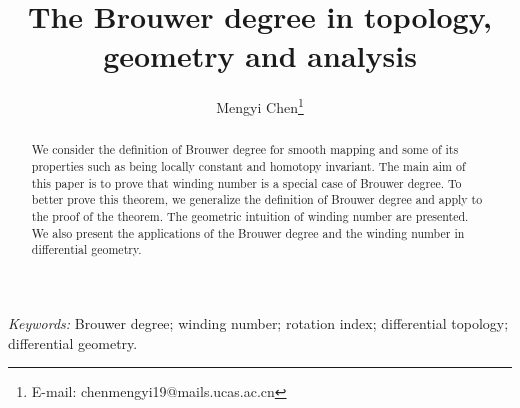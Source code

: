 \documentclass[11pt]{article}
\numberwithin{equation}{section} \numberwithin{theorem}{section}
\numberwithin{lemma}{section} \numberwithin{remark}{section}
\numberwithin{table}{section} \numberwithin{corollary}{section}
\numberwithin{example}{section} \numberwithin{conjecture}{section}
\numberwithin{assumption}{section}
\numberwithin{definition}{section}
\numberwithin{proposition}{section}
\begin{document}
\title{The Brouwer degree in topology, geometry and analysis}

\author[1]{Mengyi Chen\thanks{E-mail: chenmengyi19@mails.ucas.ac.cn}}


\maketitle
\begin{abstract}
    We consider the definition of Brouwer degree for smooth mapping and some of its properties such as being locally constant and homotopy invariant. The main aim of this paper is to prove that winding number is a special case of Brouwer degree. To better prove this theorem, we generalize the definition of Brouwer degree and apply to the proof of the theorem. The geometric intuition of winding number are presented. 
    We also present the applications of the Brouwer degree and the winding number in differential geometry.
\end{abstract}

\emph{Keywords:}
Brouwer degree; winding number; rotation index; differential topology; differential geometry.
\end{document}
